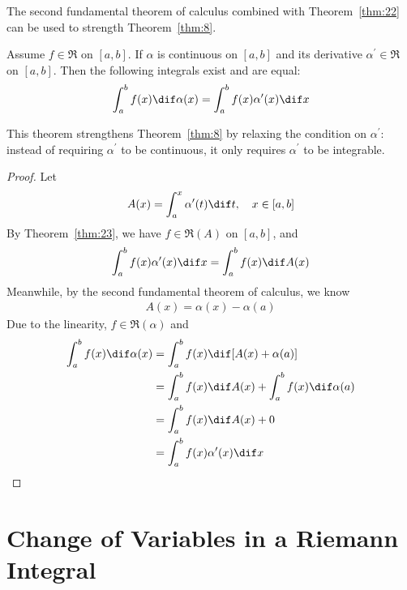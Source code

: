 \documentclass[thmcnt=section, color=blue, 12pt]{my-elegantbook}
\begin{document}
The second fundamental theorem of calculus combined
with Theorem~\ref{thm:22}
can be used to strength Theorem~\ref{thm:8}.

\begin{theorem} \label{thm:27}
	Assume $f \in \mathfrak{R}$ on $[a, b]$.
	If $\alpha$ is continuous on $[a, b]$
	and its derivative $\alpha^\prime \in \mathfrak{R}$ on $[a, b]$.
	Then the following integrals exist and are equal:
	\begin{align*}
		\int_a^b f(x) \dif \alpha(x)
		= \int_a^b f(x) \alpha^\prime(x) \dif x
	\end{align*}
\end{theorem}

\begin{note}
	This theorem strengthens Theorem~\ref{thm:8}
	by relaxing the condition on $\alpha^\prime$:
	instead of requiring $\alpha^\prime$ to be continuous,
	it only requires $\alpha^\prime$ to be integrable.
\end{note}

\begin{proof}
	Let
	\begin{align*}
		A(x) = \int_a^x \alpha^\prime(t) \dif t, \quad x \in [a, b]
	\end{align*}
	By Theorem~\ref{thm:23}, we have $f \in \mathfrak{R}(A)$ on $[a, b]$,
	and
	\begin{align*}
		\int_a^b f(x) \alpha^\prime(x) \dif x
		= \int_a^b f(x) \dif A(x)
	\end{align*}
	Meanwhile, by the second fundamental theorem of calculus, we know
	\begin{align*}
		A(x) = \alpha(x) - \alpha(a)
	\end{align*}
	Due to the linearity, $f \in \mathfrak{R}(\alpha)$ and
	\begin{align*}
		\int_a^b f(x) \dif \alpha(x)
		 & = \int_a^b f(x) \dif [A(x) + \alpha(a)]                  \\
		 & = \int_a^b f(x) \dif A(x) + \int_a^b f(x) \dif \alpha(a) \\
		 & = \int_a^b f(x) \dif A(x) + 0                            \\
		 & = \int_a^b f(x) \alpha^\prime(x) \dif x
	\end{align*}
\end{proof}



\section{Change of Variables in a Riemann Integral}
\end{document}
